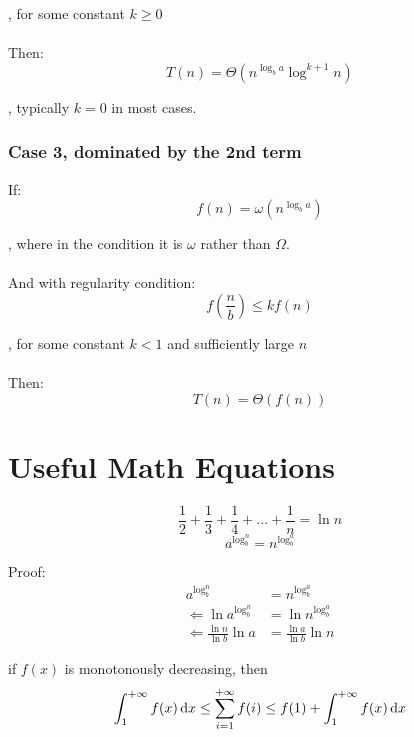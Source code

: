 , for some constant $k \geq 0$\\\\
Then:
$$
T(n) = \Theta(n^{\log_b a} \log^{k+1} n)
$$

, typically $k=0$ in most cases. 
\subsubsection*{Case 3, dominated by the 2nd term}
If:
$$f(n) = \omega(n^{\log_b a})$$

, where in the condition it is $\omega$ rather than $\Omega$. \\\\
And with regularity condition:
$$f(\frac{n}{b}) \le k f(n)$$

, for some constant $k < 1$ and sufficiently large $n$\\\\
Then:
$$T\left(n \right) = \Theta\left(f(n) \right)$$
\section{Useful Math Equations}
$$
\frac{1}{2}+\frac{1}{3}+\frac{1}{4} + ... + \frac{1}{n} = \ln{n}
$$
$$
a^{\log_b^n} = n^{\log_b^a}
$$

Proof:
\begin{align*}
a^{\log_b^n} &= n^{\log_b^a} \\
\Leftarrow \ln{a^{\log_b^n}} &= \ln{n^{\log_b^a}}\\
\Leftarrow  \frac{\ln n}{\ln b}\ln a &=\frac{\ln a}{\ln b}\ln n
\end{align*}


if $f(x)$ is monotonously decreasing, then
$$
\int_1^{+\infty}f(x) \mathop{}\!\mathrm{d} x \leq \sum_{i=1}^{+\infty} f(i) \leq f(1) + \int_1^{+\infty}f(x) \mathop{}\!\mathrm{d} x 
$$
